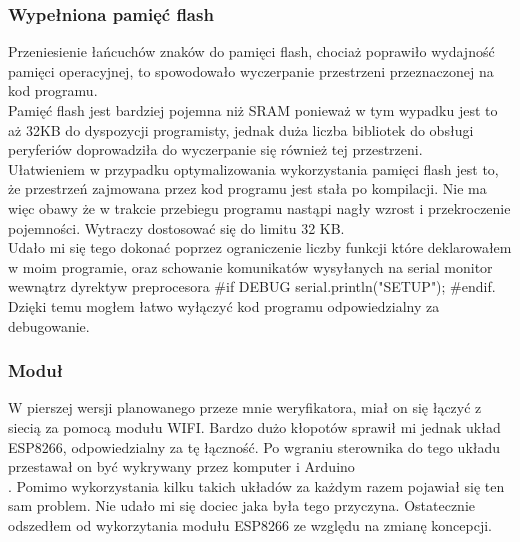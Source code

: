 \documentclass[declaration,shortabstract, mgr]{iithesis}
\begin{document}
\subsubsection{Wypełniona pamięć flash}
\indent Przeniesienie łańcuchów znaków do pamięci flash, chociaż poprawiło wydajność pamięci operacyjnej, to spowodowało wyczerpanie przestrzeni przeznaczonej  na kod programu. \\
\indent Pamięć flash jest bardziej pojemna niż SRAM ponieważ w tym wypadku jest to aż 32KB do dyspozycji programisty, jednak duża liczba bibliotek do obsługi peryferiów doprowadziła do wyczerpanie się również tej przestrzeni. \\
\indent Ułatwieniem w przypadku optymalizowania wykorzystania pamięci flash jest to, że przestrzeń zajmowana przez kod programu jest stała po kompilacji. Nie ma więc obawy że w trakcie przebiegu programu nastąpi nagły wzrost i przekroczenie pojemności. Wytraczy dostosować się do limitu 32 KB. \\
\indent Udało mi się tego dokonać poprzez ograniczenie liczby funkcji które deklarowałem w moim programie, oraz schowanie komunikatów wysyłanych na serial monitor wewnątrz dyrektyw preprocesora \#if DEBUG serial.println("SETUP"); \#endif. Dzięki temu mogłem łatwo wyłączyć kod programu odpowiedzialny za debugowanie.\\
\subsubsection{Moduł}
\indent W pierszej wersji planowanego przeze mnie weryfikatora, miał on się łączyć z siecią za pomocą modułu WIFI. Bardzo dużo kłopotów sprawił mi jednak układ ESP8266, odpowiedzialny za tę łączność. Po wgraniu sterownika do tego układu przestawał on być wykrywany przez komputer i Arduino\\. \indent Pomimo wykorzystania kilku takich układów za każdym razem pojawiał się ten sam problem. Nie udało mi się dociec jaka była tego przyczyna. Ostatecznie odszedłem od wykorzytania modułu ESP8266 ze względu na zmianę koncepcji.
\end{document}
